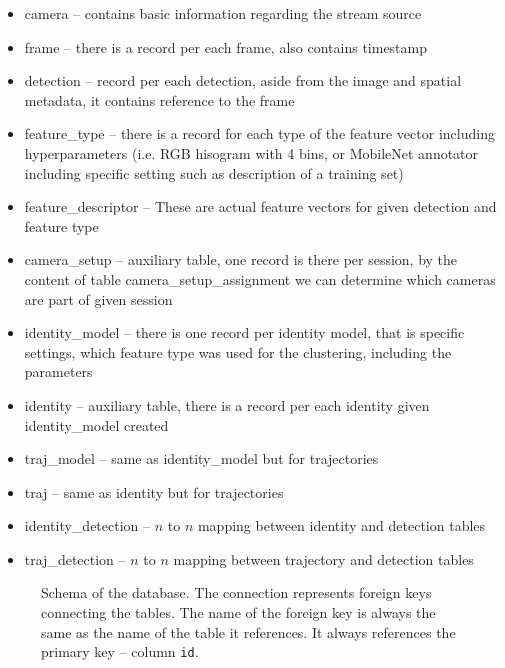 \begin{itemize}
    \item camera -- contains basic information regarding the stream source
    \item frame -- there is a record per each frame, also contains timestamp
    \item detection -- record per each detection, aside from the image and spatial metadata, it contains reference to the frame
    \item feature\_type -- there is a record for each type of the feature vector including hyperparameters (i.e. RGB hisogram with 4 bins, or MobileNet annotator including specific setting such as description of a training set)
    \item feature\_descriptor -- These are actual feature vectors for given detection and feature type
    \item camera\_setup -- auxiliary table, one record is there per session, by the content of table camera\_setup\_assignment we can determine which cameras are part of given session
    
    \item identity\_model -- there is one record per identity model, that is specific settings, which feature type was used for the clustering, including the parameters
    \item identity -- auxiliary table, there is a record per each identity given identity\_model created
    
    \item traj\_model -- same as identity\_model but for trajectories
    \item traj -- same as identity but for trajectories
    
    \item identity\_detection -- $n$ to $n$ mapping between identity and detection tables
    \item traj\_detection -- $n$ to $n$ mapping between trajectory and detection tables
\end{itemize}

\begin{figure}
    \centering
    \footnotesize
    \def\svgwidth{\columnwidth}
    
    \caption[Schema of the database]{Schema of the database. The connection represents foreign keys connecting the tables. The name of the foreign key is always the same as the name of the table it references. It always references the primary key -- column \texttt{id}.}
    \label{fig:database_schema}
\end{figure}

